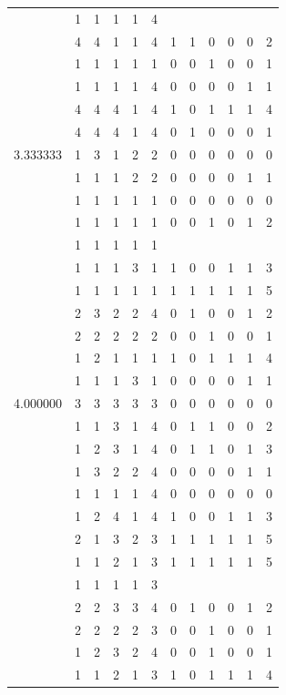 \documentclass[]{book}
\theoremstyle{definition}
\theoremstyle{definition}
\theoremstyle{definition}
\theoremstyle{remark}
\begin{document}
\begin{table}
{\begin{tabular}[t]{rrrrrrrrrrrr}
 & 1 & 1 & 1 & 1 & 4 &  &  &  &  &  & \\
 & 4 & 4 & 1 & 1 & 4 & 1 & 1 & 0 & 0 & 0 & 2\\
 & 1 & 1 & 1 & 1 & 1 & 0 & 0 & 1 & 0 & 0 & 1\\
 & 1 & 1 & 1 & 1 & 4 & 0 & 0 & 0 & 0 & 1 & 1\\
 & 4 & 4 & 4 & 1 & 4 & 1 & 0 & 1 & 1 & 1 & 4\\
 & 4 & 4 & 4 & 1 & 4 & 0 & 1 & 0 & 0 & 0 & 1\\
3.333333 & 1 & 3 & 1 & 2 & 2 & 0 & 0 & 0 & 0 & 0 & 0\\
 & 1 & 1 & 1 & 2 & 2 & 0 & 0 & 0 & 0 & 1 & 1\\
 & 1 & 1 & 1 & 1 & 1 & 0 & 0 & 0 & 0 & 0 & 0\\
 & 1 & 1 & 1 & 1 & 1 & 0 & 0 & 1 & 0 & 1 & 2\\
 & 1 & 1 & 1 & 1 & 1 &  &  &  &  &  & \\
 & 1 & 1 & 1 & 3 & 1 & 1 & 0 & 0 & 1 & 1 & 3\\
 & 1 & 1 & 1 & 1 & 1 & 1 & 1 & 1 & 1 & 1 & 5\\
 & 2 & 3 & 2 & 2 & 4 & 0 & 1 & 0 & 0 & 1 & 2\\
 & 2 & 2 & 2 & 2 & 2 & 0 & 0 & 1 & 0 & 0 & 1\\
 & 1 & 2 & 1 & 1 & 1 & 1 & 0 & 1 & 1 & 1 & 4\\
 & 1 & 1 & 1 & 3 & 1 & 0 & 0 & 0 & 0 & 1 & 1\\
4.000000 & 3 & 3 & 3 & 3 & 3 & 0 & 0 & 0 & 0 & 0 & 0\\
 & 1 & 1 & 3 & 1 & 4 & 0 & 1 & 1 & 0 & 0 & 2\\
 & 1 & 2 & 3 & 1 & 4 & 0 & 1 & 1 & 0 & 1 & 3\\
 & 1 & 3 & 2 & 2 & 4 & 0 & 0 & 0 & 0 & 1 & 1\\
 & 1 & 1 & 1 & 1 & 4 & 0 & 0 & 0 & 0 & 0 & 0\\
 & 1 & 2 & 4 & 1 & 4 & 1 & 0 & 0 & 1 & 1 & 3\\
 & 2 & 1 & 3 & 2 & 3 & 1 & 1 & 1 & 1 & 1 & 5\\
 & 1 & 1 & 2 & 1 & 3 & 1 & 1 & 1 & 1 & 1 & 5\\
 & 1 & 1 & 1 & 1 & 3 &  &  &  &  &  & \\
 & 2 & 2 & 3 & 3 & 4 & 0 & 1 & 0 & 0 & 1 & 2\\
 & 2 & 2 & 2 & 2 & 3 & 0 & 0 & 1 & 0 & 0 & 1\\
 & 1 & 2 & 3 & 2 & 4 & 0 & 0 & 1 & 0 & 0 & 1\\
 & 1 & 1 & 2 & 1 & 3 & 1 & 0 & 1 & 1 & 1 & 4\\

\end{tabular}}
\end{table}
\end{document}
